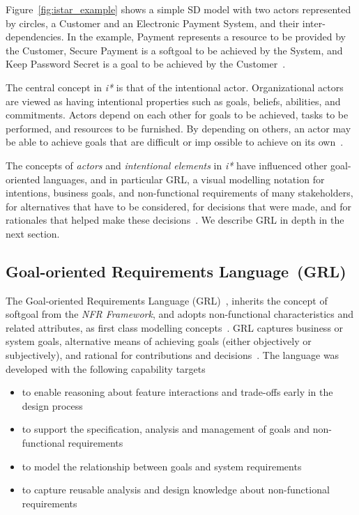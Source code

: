 \documentclass[dissertation,final]{softeng}
\begin{document}
{Figure~\ref{fig:istar_example} shows a simple SD model with two actors represented by circles, a Customer and an Electronic Payment System, and their inter-dependencies. In the example, Payment represents a resource to be provided by the Customer, Secure Payment is a softgoal to be achieved by the System, and Keep Password Secret is a goal to be achieved by the Customer~\citep{Roy:2007wyba}.

The central concept in \emph{i*} is that of the intentional actor. Organizational actors are viewed as having intentional properties such as goals, beliefs, abilities, and commitments. Actors depend on each other for goals to be achieved, tasks to be performed, and resources to be furnished. By depending on others, an actor may be able to achieve goals that are difficult or imp 	ossible to achieve on its own~\citep{Yu1997}.

The concepts of \emph{actors} and \emph{intentional elements} in \emph{i*} have influenced other goal-oriented languages, and in particular GRL, a visual modelling notation for intentions, business goals, and non-functional requirements of many stakeholders, for alternatives that have to be considered, for decisions that were made, and for rationales that helped make these decisions~\citep{amyot2011user}. We describe GRL in depth in the next section.

\subsection{Goal-oriented Requirements Language~(GRL)}
\label{sec:gore}
The Goal-oriented Requirements Language (GRL)~\citep{Amyot2010}, inherits the concept of softgoal from the \emph{NFR Framework}, and adopts non-functional characteristics and related attributes, as first class modelling concepts~\citep{Chung:2009vg}. GRL captures business or system goals, alternative means of achieving goals (either objectively or subjectively), and rational for contributions and decisions~\citep{Amyot2003}. The language was developed with the following capability targets~\citep{Amyot2003}

\begin{itemize}
\item to enable reasoning about feature interactions and trade-offs early in the design process
\item to support the specification, analysis and management of goals and non-functional requirements
\item to model the relationship between goals and system requirements
\item to capture reusable analysis and design knowledge about non-functional requirements
\end{itemize}

}
\end{document}
